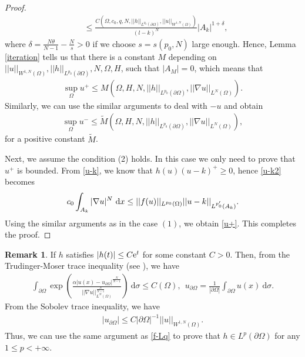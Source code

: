\documentclass[reqno, 11pt]{amsart} %
\numberwithin{equation}{section}
\theoremstyle{definition}
\newtheorem{rmk}[thm]{Remark}
\newcommand{\pa}{\partial}
\newcommand{\e}{\textup{e}}
\newcommand{\dx}{\textup{d}x}
\begin{document}
\begin{proof}
\begin{align*}
        & \leq \frac{C(\Omega, c_0, q, N , ||h||_{L^{p_0}(\pa\Omega)}, || u||_{W^{1,N}(\Omega)})}{(l-k)^N} |A_k|^{1+ \delta},
    \end{align*}
    where $\delta = \frac{N\theta}{N-1} - \frac{N}{s}>0$ if we choose $s= s(p_0,N)$ large enough. Hence, Lemma \ref{iteration} tells us that there is a constant $M$ depending on $|| u||_{W^{1,N}(\Omega)}, ||h||_{L^{p_0}(\pa\Omega)},  N, \Omega, H$, such that $|A_M| = 0$, which means that
    \begin{align}\label{u+}
        \sup_{\Omega} u^+  \leq M(\Omega, H, N, ||h||_{L^{p_0}(\pa\Omega)},||\nabla u||_{L^N(\Omega)}).
    \end{align}
    Similarly, we can use the similar arguments to deal with $-u$ and obtain
    \begin{align}\label{u-}
        \sup_{\Omega} u^-  \leq \tilde{M} (\Omega, H, N, ||h||_{L^{p_0}(\pa\Omega)},||\nabla u||_{L^N(\Omega)}),
    \end{align}
    for a positive constant $\tilde{M}$.

     Next, we assume the condition (2) holds. In this case we only need to prove that $u^+$ is bounded. From \eqref{u-k}, we know that $h(u)(u-k)^+ \geq 0$, hence \eqref{u-k2} becomes
     \begin{align*}
         c_0 \int_{A_k} |\nabla u|^N \ \dx  \leq ||f(u)||_{L^{p_0}(\Omega)} ||u-k||_{L^{p_0'}(A_k)}.
     \end{align*}
     Using the similar arguments as in the case $(1)$, we obtain \eqref{u+}. This completes the proof.
\end{proof}

\begin{rmk}
    If $h$ satisfies $|h(t)| \leq C\e^{t}$ for some constant $C>0$. Then, from the Trudinger-Moser trace inequality (see \cite{C2008}), we have
    \begin{align*}
        \int_{\partial \Omega} \exp\left(\frac{\alpha |u(x) - u_{\pa \Omega}|^{\frac{N}{N-1}}}{||\nabla u||_{L^N(\Omega)}^{\frac{N}{N-1}}} \right)  \ \text{d} \sigma \leq C(\Omega), \ \ u_{\partial \Omega} = \frac{1}{|\partial \Omega|} \int_{\partial \Omega} u(x) \ \text{d} \sigma.
    \end{align*}
    From the Sobolev trace inequality, we have
    \begin{align*}
        |u_{\pa \Omega}| \leq C|\pa \Omega|^{-1} ||u||_{W^{1,N}(\Omega)}.
    \end{align*}
    Thus, we can use the same argument as \eqref{f-Lq} to prove that $h \in L^p(\partial \Omega)$ for any $1\leq p < +\infty$.
\end{rmk}
\end{document}
